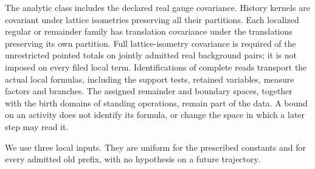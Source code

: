 \documentclass[11pt,letterpaper,reqno]{amsart}
\numberwithin{equation}{section}
\theoremstyle{definition}
\theoremstyle{remark}
\begin{document}
The analytic class includes the declared real gauge covariance.
History kernels are covariant under lattice isometries preserving
all their partitions. Each localized regular or remainder family
has translation covariance under the translations preserving its
own partition. Full lattice-isometry covariance is required of the
unrestricted pointed totals on jointly admitted real background
pairs; it is not imposed on every filed local term. Identifications of complete reads
transport the actual local formulas, including the support tests,
retained variables, measure factors and branches. The assigned
remainder and boundary spaces, together with the birth domains of
standing operations, remain part of the data. A bound on an activity
does not identify its formula, or change the space in which a later
step may read it.

We use three local inputs. They are uniform for the prescribed
constants and for every admitted old prefix, with no hypothesis on a
future trajectory.
\end{document}
